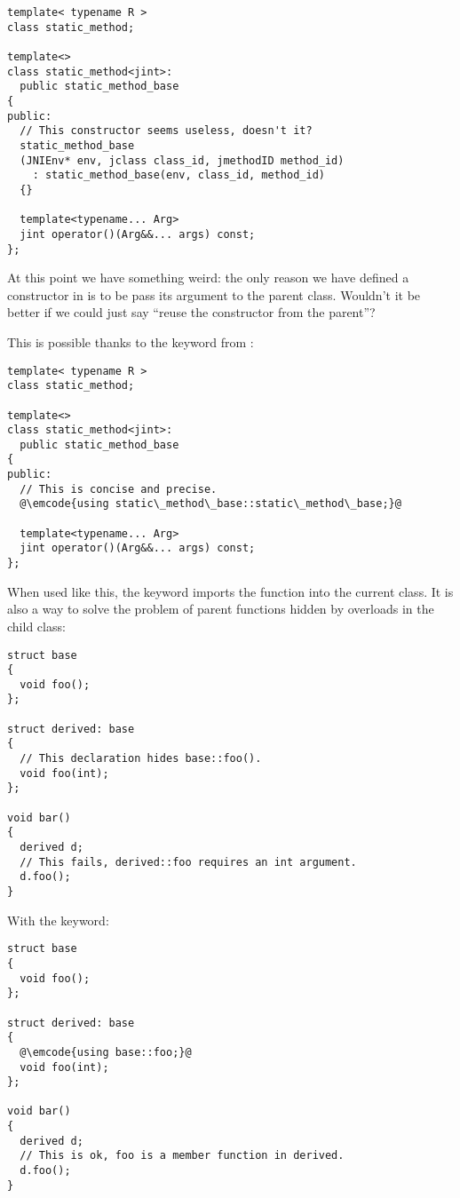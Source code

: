 \begin{lstlisting}
template< typename R >
class static_method;

template<>
class static_method<jint>:
  public static_method_base
{
public:
  // This constructor seems useless, doesn't it?
  static_method_base
  (JNIEnv* env, jclass class_id, jmethodID method_id)
    : static_method_base(env, class_id, method_id)
  {}

  template<typename... Arg>
  jint operator()(Arg&&... args) const;
};
\end{lstlisting}

At this point we have something weird: the only reason we have defined
a constructor in  is
to be pass its argument to the parent class. Wouldn't it be better if
we could just say ``reuse the constructor from the parent''?

\bigskip

This is possible thanks to the  keyword from \cpp{}:

\begin{lstlisting}
template< typename R >
class static_method;

template<>
class static_method<jint>:
  public static_method_base
{
public:
  // This is concise and precise.
  @\emcode{using static\_method\_base::static\_method\_base;}@

  template<typename... Arg>
  jint operator()(Arg&&... args) const;
};
\end{lstlisting}

When used like this, the  keyword imports the function
into the current class. It is also a way to solve the problem of
parent functions hidden by overloads in the child class:

\begin{lstlisting}
struct base
{
  void foo();
};

struct derived: base
{
  // This declaration hides base::foo().
  void foo(int);
};

void bar()
{
  derived d;
  // This fails, derived::foo requires an int argument.
  d.foo();
}
\end{lstlisting}

With the  keyword:

\begin{lstlisting}
struct base
{
  void foo();
};

struct derived: base
{
  @\emcode{using base::foo;}@
  void foo(int);
};

void bar()
{
  derived d;
  // This is ok, foo is a member function in derived.
  d.foo();
}
\end{lstlisting}

